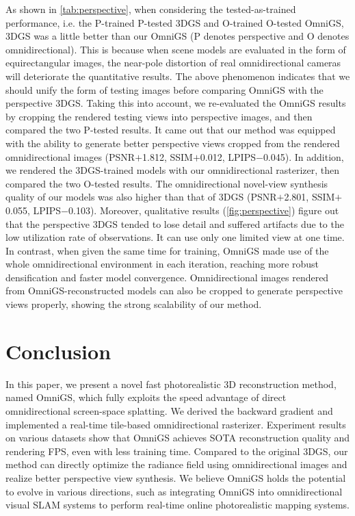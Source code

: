 \documentclass[10pt,twocolumn,letterpaper]{article}
\begin{document}
As shown in \cref{tab:perspective}, when considering the tested-as-trained performance, i.e. the P-trained P-tested 3DGS and O-trained O-tested OmniGS, 3DGS was a little better than our OmniGS (P denotes perspective and O denotes omnidirectional). This is because when scene models are evaluated in the form of equirectangular images, the near-pole distortion of real omnidirectional cameras will deteriorate the quantitative results\cite{nerf:egonerf}. The above phenomenon indicates that we should unify the form of testing images before comparing OmniGS with the perspective 3DGS. Taking this into account, we re-evaluated the OmniGS results by cropping the rendered testing views into perspective images, and then compared the two P-tested results. It came out that our method was equipped with the ability to generate better perspective views cropped from the rendered omnidirectional images (PSNR$+$1.812, SSIM$+$0.012, LPIPS$-$0.045). In addition, we rendered the 3DGS-trained models with our omnidirectional rasterizer, then compared the two O-tested results. The omnidirectional novel-view synthesis quality of our models was also higher than that of 3DGS (PSNR$+$2.801, SSIM$+$0.055, LPIPS$-$0.103). Moreover, qualitative results (\cref{fig:perspective}) figure out that the perspective 3DGS tended to lose detail and suffered artifacts due to the low utilization rate of observations. It can use only one limited view at one time. In contrast, when given the same time for training, OmniGS made use of the whole omnidirectional environment in each iteration, reaching more robust densification and faster model convergence. Omnidirectional images rendered from OmniGS-reconstructed models can also be cropped to generate perspective views properly, showing the strong scalability of our method.


\section{Conclusion} %
In this paper, we present a novel fast photorealistic 3D reconstruction method, named OmniGS, which fully exploits the speed advantage of direct omnidirectional screen-space splatting. We derived the backward gradient and implemented a real-time tile-based omnidirectional rasterizer. Experiment results on various datasets show that OmniGS achieves SOTA reconstruction quality and rendering FPS, even with less training time. 
Compared to the original 3DGS, our method can directly optimize the radiance field using omnidirectional images and realize better perspective view synthesis. We believe OmniGS holds the potential to evolve in various directions, such as integrating OmniGS into omnidirectional visual SLAM systems to perform real-time online photorealistic mapping systems.
\end{document}
